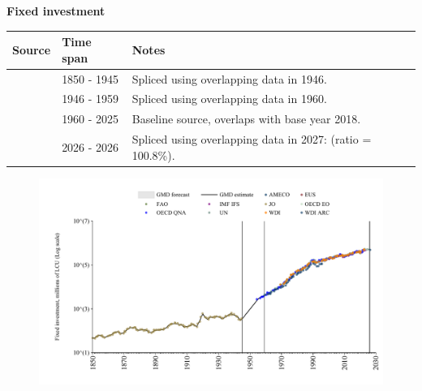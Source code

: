 \documentclass[12pt,a4paper,landscape]{article}
\begin{document}
\begin{adjustbox}{max totalsize={\paperwidth}{\paperheight},center}
\begin{minipage}[t][\textheight][t]{\textwidth}
\vspace*{0.5cm}
{}
\begin{center}
{\Large\bfseries Fixed investment}
\end{center}
\vspace{0.5cm}
\begin{table}[H]
\centering
\small
\begin{tabular}{|l|l|l|}
\hline
\textbf{Source} & \textbf{Time span} & \textbf{Notes} \\
\hline
\rowcolor{white}\cite{JO}& 1850 - 1945 &Spliced using overlapping data in 1946. \\
\rowcolor{lightgray}\cite{OECD_QNA}& 1946 - 1959 &Spliced using overlapping data in 1960. \\
\rowcolor{white}\cite{OECD_EO}& 1960 - 2025 &Baseline source, overlaps with base year 2018. \\
\rowcolor{lightgray}\cite{AMECO}& 2026 - 2026 &Spliced using overlapping data in 2027: (ratio = 100.8\%). \\
\hline
\end{tabular}
\end{table}
\begin{figure}[H]
\centering
\includegraphics[width=\textwidth,height=0.6\textheight,keepaspectratio]{graphs/GBR_finv.pdf}
\end{figure}
\end{minipage}
\end{adjustbox}
\end{document}
